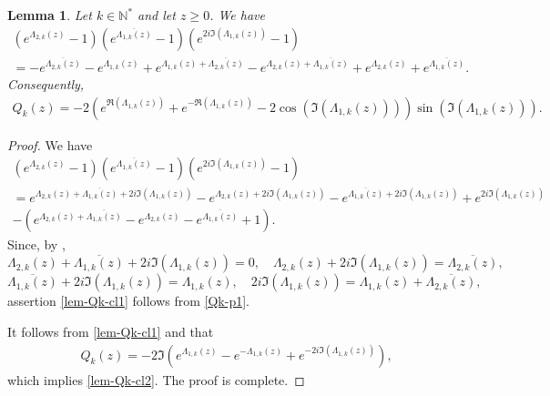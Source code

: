 \documentclass[11pt, reqno]{amsart}
\theoremstyle{plain}
\newtheorem{lemma}[thm]{Lemma}
\numberwithin{equation}{section}
\newcommand{\mN}{\mathbb{N}}
\begin{document}
\begin{lemma} \label{lem-Qk} Let $k \in \mN^*$ and let $z \ge 0$. We have 
\begin{multline} \label{lem-Qk-cl1}
\left(e^{\Lambda_{2,k}(z)} - 1 \right) \left(e^{\overline{\Lambda_{1,k}(z)}} - 1 \right) \left(e^{2i \Im (\Lambda_{1,k}(z)) } - 1 \right) \\[6pt]
= - e^{\overline{\Lambda_{2, k}(z)}} - e^{\Lambda_{1, k}(z)} +  e^{\Lambda_{1,k}(z) + \overline{\Lambda_{2,k}(z)}} 
- e^{\Lambda_{2,k}(z) + \overline{\Lambda_{1,k}(z)}} + e^{\Lambda_{2,k}(z)} + e^{\overline{\Lambda_{1,k}(z)}}. 
\end{multline}
Consequently,  
\begin{align} \label{lem-Qk-cl2} 
 Q_k(z) = - 2 \left(e^{\Re (\Lambda_{1,k}(z))} + e^{-\Re (\Lambda_{1,k}(z))} - 2 \cos (\Im (\Lambda_{1,k}(z)) ) \right)  \sin (\Im (\Lambda_{1,k}(z))).
\end{align}
\end{lemma}

\begin{proof} We have 
\begin{multline}\label{Qk-p1}
\left(e^{\Lambda_{2,k}(z)} - 1 \right) \left(e^{\overline{\Lambda_{1,k}(z)}} - 1 \right) \left(e^{2i \Im (\Lambda_{1,k}(z)) } - 1 \right) \\[6pt]
= e^{\Lambda_{2,k}(z) + \overline{\Lambda_{1,k}(z)} + 2i \Im (\Lambda_{1,k}(z)) } - e^{\Lambda_{2,k}(z) + 2i \Im (\Lambda_{1,k}(z)) } - e^{\overline{\Lambda_{1,k}(z)} + 2i \Im (\Lambda_{1,k}(z)) }  + e^{2i \Im (\Lambda_{1,k}(z)) } \\[6pt]
- \left( e^{\Lambda_{2,k}(z) + \overline{\Lambda_{1,k}(z)}} - e^{\Lambda_{2,k}(z)} - e^{\overline{\Lambda_{1,k}(z)}}  + 1  \right).
\end{multline}
Since, by , 
$$
\Lambda_{2,k}(z) + \overline{\Lambda_{1,k}(z)} + 2i \Im (\Lambda_{1,k}(z)) =0, \quad \Lambda_{2,k}(z) + 2i \Im (\Lambda_{1,k}(z)) = \overline{\Lambda_{2, k}(z)},
$$ 
$$
\overline{\Lambda_{1,k}(z)} + 2i \Im (\Lambda_{1,k}(z)) = \Lambda_{1, k}(z), \quad 2i \Im (\Lambda_{1,k}(z))  = \Lambda_{1,k}(z) + \overline{\Lambda_{2,k}(z)},
$$
assertion \eqref{lem-Qk-cl1} follows from \eqref{Qk-p1}. 

It follows from \eqref{lem-Qk-cl1} and  that 
\begin{align} 
 Q_k(z) = - 2 \Im \left(e^{\Lambda_{1,k}(z)} - e^{- \Lambda_{1,k}(z)} + e^{-2 i \Im(\Lambda_{1,k}(z))} \right),
\end{align}
which implies \eqref{lem-Qk-cl2}. 
The proof is complete. 
\end{proof}
\end{document}
